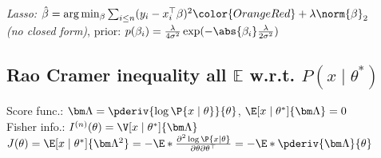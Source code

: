     \emph{Lasso:}\enspace
    $\hat\beta = \arg\min_\beta \sum_{i\leq n} (y_i - x_i^\top \beta)^2 \color{OrangeRed} + \lambda \norm{\beta}_2$ \\\quad
    \textit{(no closed form)},
    \quad prior: $p(\beta_i) = \frac{\lambda}{4\sigma^2} \exp(-\abs{\beta_i} \frac{\lambda}{2\sigma^2})$
\fi


\iffalse
    \subsection{Estimation - MLE Properties}
    
    \emph{Consistency:}
    $\forall\epsilon>0, \; \mathbb P\{ \abs{\hat\theta_n - \theta^\ast} > \epsilon \} \overset{n\to\infty}{\longrightarrow} 0$
    
    \emph{Equivariance:}
    If $\hat\theta_n$ is MLE of $\theta$, then $g(\hat\theta_n)$ is MLE of $g(\theta)$.
    
    \emph{Asympt. normality:}\\
    $\sqrt{N} (\hat\theta_n - \theta^\ast) \to \Gauss{0,\, J^{-1}(\theta^\ast) I(\theta^\ast) J^{-1}(\theta^\ast)}$%
    
    \emph{Asympt. efficiency:}
    $\hat\theta_n$ minimises $\E{(\hat\theta_n - \theta^\ast)^2}$ as $n\to\infty$, i.e. $\E{(\hat\theta_n - \theta^\ast)^2} = \frac{1}{I^{(n)}(\theta^\ast)}$ (Rao Cr.)\\
    Among all consistent estimators $\hat\theta_n$ has \textit{smallest variance}: $\lim_{n\to\infty} (\V{\hat\theta_n} I^{(n)}(\theta^\ast))^{-1} = 1$
\fi

\iffalse
    \subsection{Rao Cramer inequality \hfill {\normalfont\footnotesize all $\mathbb E$ w.r.t. $P(x\mid\theta^\ast)$}}
    
    Score func.: $\bm\Lambda = \pderiv{\log\P{x\mid\theta}}{\theta}$,\; $\E[x\mid\theta^\ast]{\bm\Lambda} = 0$\\
    Fisher info.: $I^{(n)}(\theta) = \V[x\mid\theta^\ast]{\bm\Lambda}$\\
    $J(\theta) = \E[x\mid\theta^\ast]{\bm\Lambda^2} = -\E*{\frac{\partial^2 \log \P{x\mid\theta}}{\partial\theta\partial\theta^\top}} = -\E*{\pderiv{\bm\Lambda}{\theta}}$
    
